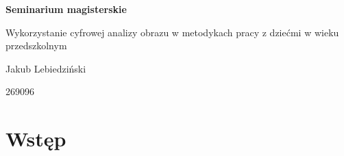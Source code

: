 \documentclass{article}
\begin{document}

\centerline{\textbf{\Large Seminarium magisterskie}}
\vspace{10mm}
{\Large Wykorzystanie cyfrowej analizy obrazu w metodykach pracy z dziećmi w wieku przedszkolnym}

\vspace{10mm}
\centerline{\large Jakub Lebiedziński} 
\vspace{1mm}
\centerline{\normalsize {269096}} 
\vspace{5mm} 

\linespread{1.3} %
\large %

\section*{\textbf{Wstęp}}
\end{document}
